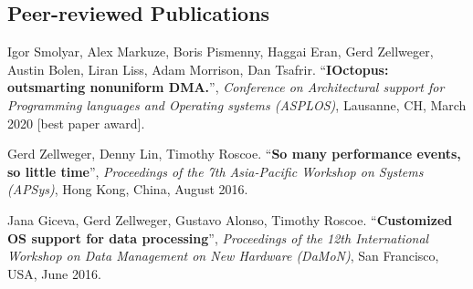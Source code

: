\documentclass[margin,line]{cv}
\begin{document}
\begin{resume}



    \pagebreak

    \section{\mysidestyle Peer-reviewed Publications}

    Igor Smolyar, Alex Markuze, Boris Pismenny, Haggai Eran, Gerd Zellweger, Austin Bolen, Liran Liss, Adam Morrison, Dan Tsafrir.
    ``\textbf{IOctopus: outsmarting nonuniform DMA.}'', \textsl{Conference on Architectural support for Programming languages and Operating systems (ASPLOS)}, Lausanne, CH, March 2020 [best paper award].

    Gerd Zellweger, Denny Lin, Timothy Roscoe.
    ``\textbf{So many performance events, so little time}'', \textsl{Proceedings of the 7th Asia-Pacific Workshop on Systems (APSys)}, Hong Kong, China, August 2016.

    Jana Giceva, Gerd Zellweger, Gustavo Alonso, Timothy Roscoe.
    ``\textbf{Customized OS support for data processing}'',
    \textsl{Proceedings of the 12th International Workshop on Data Management on New Hardware (DaMoN)}, San Francisco, USA, June 2016.


\end{resume}
\end{document}
